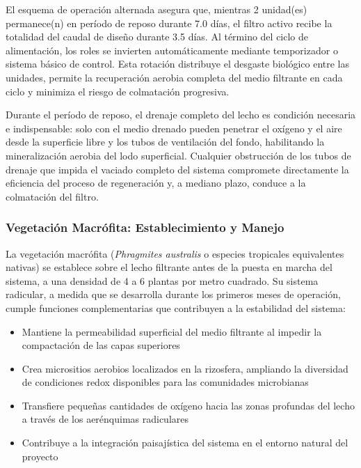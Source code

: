 \documentclass[12pt,a4paper]{article}
\begin{document}
El esquema de operación alternada asegura que, mientras 2 unidad(es) permanece(n) en período de reposo durante 7.0 días, el filtro activo recibe la totalidad del caudal de diseño durante 3.5 días. Al término del ciclo de alimentación, los roles se invierten automáticamente mediante temporizador o sistema básico de control. Esta rotación distribuye el desgaste biológico entre las unidades, permite la recuperación aerobia completa del medio filtrante en cada ciclo y minimiza el riesgo de colmatación progresiva.

Durante el período de reposo, el drenaje completo del lecho es condición necesaria e indispensable: solo con el medio drenado pueden penetrar el oxígeno y el aire desde la superficie libre y los tubos de ventilación del fondo, habilitando la mineralización aerobia del lodo superficial. Cualquier obstrucción de los tubos de drenaje que impida el vaciado completo del sistema compromete directamente la eficiencia del proceso de regeneración y, a mediano plazo, conduce a la colmatación del filtro.

\subsubsection*{Vegetación Macrófita: Establecimiento y Manejo}

La vegetación macrófita (\textit{Phragmites australis} o especies tropicales equivalentes nativas) se establece sobre el lecho filtrante antes de la puesta en marcha del sistema, a una densidad de 4 a 6 plantas por metro cuadrado. Su sistema radicular, a medida que se desarrolla durante los primeros meses de operación, cumple funciones complementarias que contribuyen a la estabilidad del sistema:

\begin{itemize}[noitemsep,leftmargin=2em]
    \item Mantiene la permeabilidad superficial del medio filtrante al impedir la compactación de las capas superiores
    \item Crea micrositios aerobios localizados en la rizosfera, ampliando la diversidad de condiciones redox disponibles para las comunidades microbianas
    \item Transfiere pequeñas cantidades de oxígeno hacia las zonas profundas del lecho a través de los aerénquimas radiculares
    \item Contribuye a la integración paisajística del sistema en el entorno natural del proyecto
\end{itemize}
\end{document}
